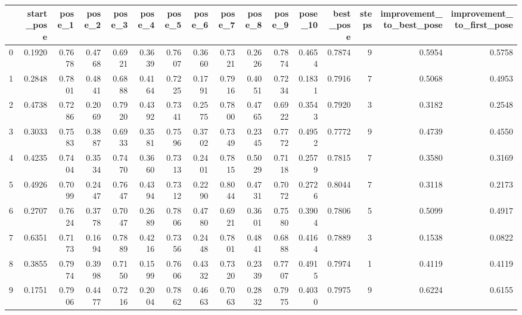 \begin{tabular}{lrrrrrrrrrrrrrrr}
\toprule
{} &  start\_pose &  pose\_1 &  pose\_2 &  pose\_3 &  pose\_4 &  pose\_5 &  pose\_6 &  pose\_7 &  pose\_8 &  pose\_9 &  pose\_10 &  best\_pose &  steps &  improvement\_to\_best\_pose &  improvement\_to\_first\_pose \\
\midrule
0   &      0.1920 &  0.7678 &  0.4768 &  0.6921 &  0.3639 &  0.7607 &  0.3660 &  0.7321 &  0.2626 &  0.7874 &   0.4654 &     0.7874 &      9 &                    0.5954 &                     0.5758 \\
1   &      0.2848 &  0.7801 &  0.4841 &  0.6888 &  0.4164 &  0.7225 &  0.1791 &  0.7916 &  0.4051 &  0.7234 &   0.1831 &     0.7916 &      7 &                    0.5068 &                     0.4953 \\
2   &      0.4738 &  0.7286 &  0.2069 &  0.7920 &  0.4392 &  0.7341 &  0.2575 &  0.7800 &  0.4765 &  0.6922 &   0.3543 &     0.7920 &      3 &                    0.3182 &                     0.2548 \\
3   &      0.3033 &  0.7583 &  0.3887 &  0.6933 &  0.3581 &  0.7596 &  0.3702 &  0.7349 &  0.2345 &  0.7772 &   0.4952 &     0.7772 &      9 &                    0.4739 &                     0.4550 \\
4   &      0.4235 &  0.7404 &  0.3534 &  0.7470 &  0.3660 &  0.7313 &  0.2401 &  0.7815 &  0.5029 &  0.7118 &   0.2579 &     0.7815 &      7 &                    0.3580 &                     0.3169 \\
5   &      0.4926 &  0.7099 &  0.2447 &  0.7647 &  0.4394 &  0.7312 &  0.2290 &  0.8044 &  0.4731 &  0.7072 &   0.2726 &     0.8044 &      7 &                    0.3118 &                     0.2173 \\
6   &      0.2707 &  0.7624 &  0.3778 &  0.7047 &  0.2689 &  0.7806 &  0.4780 &  0.6921 &  0.3601 &  0.7580 &   0.3904 &     0.7806 &      5 &                    0.5099 &                     0.4917 \\
7   &      0.6351 &  0.7173 &  0.1694 &  0.7889 &  0.4216 &  0.7356 &  0.2448 &  0.7801 &  0.4841 &  0.6888 &   0.4164 &     0.7889 &      3 &                    0.1538 &                     0.0822 \\
8   &      0.3855 &  0.7974 &  0.3998 &  0.7150 &  0.1599 &  0.7606 &  0.4332 &  0.7320 &  0.2339 &  0.7707 &   0.4915 &     0.7974 &      1 &                    0.4119 &                     0.4119 \\
9   &      0.1751 &  0.7906 &  0.4477 &  0.7216 &  0.2004 &  0.7862 &  0.4663 &  0.7063 &  0.2832 &  0.7975 &   0.4030 &     0.7975 &      9 &                    0.6224 &                     0.6155 \\

\end{tabular}
